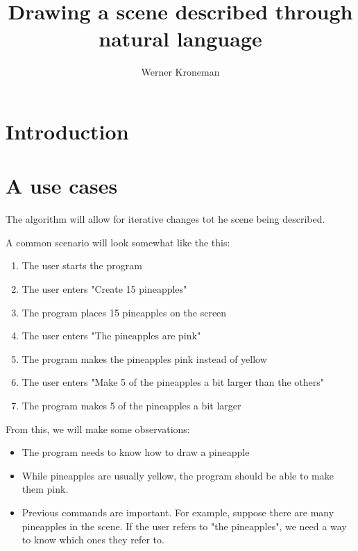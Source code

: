 \documentclass[11pt]{article}
\title{Drawing a scene described through natural language}
\author{Werner Kroneman}
\date{}
\begin{document}
\maketitle

\section{Introduction}

\section{A use cases}

The algorithm will allow for iterative changes tot he scene being described.

A common scenario will look somewhat like the this:

\begin{enumerate}

\item The user starts the program

\item The user enters "Create 15 pineapples"

\item The program places 15 pineapples on the screen

\item The user enters "The pineapples are pink"

\item The program makes the pineapples pink instead of yellow

\item The user enters "Make 5 of the pineapples a bit larger than the others"

\item The program makes 5 of the pineapples a bit larger

\end{enumerate}

From this, we will make some observations:

\begin{itemize}

\item The program needs to know how to draw a pineapple

\item While pineapples are usually yellow, the program should be able to make them pink.

\item Previous commands are important. For example, suppose there are many pineapples in the scene. If the user refers to "the pineapples", we need a way to know which ones they refer to.

\end{itemize}
\end{document}
